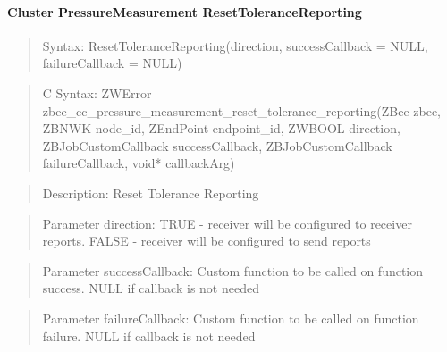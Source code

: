 \paragraph{Cluster PressureMeasurement ResetToleranceReporting}
\begin{quote}Syntax: ResetToleranceReporting(direction, successCallback = NULL, failureCallback = NULL)\end{quote}
\begin{quote}C Syntax: ZWError zbee\_cc\_pressure\_measurement\_reset\_tolerance\_reporting(ZBee zbee, ZBNWK node\_id, ZEndPoint endpoint\_id, ZWBOOL direction, ZBJobCustomCallback successCallback, ZBJobCustomCallback failureCallback, void* callbackArg)\end{quote}
\begin{quote}Description: Reset Tolerance Reporting\end{quote}
\begin{quote}Parameter direction: TRUE  - receiver will be configured to receiver reports. FALSE - receiver will be configured to send reports\end{quote}
\begin{quote}Parameter successCallback: Custom function to be called on function success. NULL if callback is not needed\end{quote}
\begin{quote}Parameter failureCallback: Custom function to be called on function failure. NULL if callback is not needed\end{quote}


